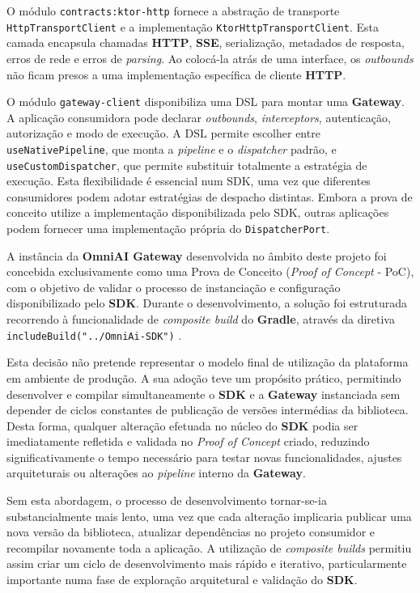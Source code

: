     O módulo \texttt{contracts:ktor-http} fornece a abstração de transporte \texttt{HttpTransportClient} e a implementação \texttt{KtorHttpTransportClient}. Esta camada encapsula chamadas \textbf{HTTP}, \textbf{SSE}, serialização, metadados de resposta, erros de rede e erros de \textit{parsing}. Ao colocá-la atrás de uma interface, os \textit{outbounds} não ficam presos a uma implementação específica de cliente \textbf{HTTP}.

    O módulo \texttt{gateway-client} disponibiliza uma DSL para montar uma \textbf{Gateway}. A aplicação consumidora pode declarar \textit{outbounds}, \textit{interceptors}, autenticação, autorização e modo de execução. A DSL permite escolher entre \texttt{useNativePipeline}, que monta a \textit{pipeline} e o \textit{dispatcher} padrão, e \texttt{useCustomDispatcher}, que permite substituir totalmente a estratégia de execução. Esta flexibilidade é essencial num SDK, uma vez que diferentes consumidores podem adotar estratégias de despacho distintas. Embora a prova de conceito utilize a implementação disponibilizada pelo SDK, outras aplicações podem fornecer uma implementação própria do \texttt{DispatcherPort}.

    A instância da \textbf{OmniAI Gateway} desenvolvida no âmbito deste projeto foi concebida exclusivamente como uma Prova de Conceito (\textit{Proof of Concept} - PoC), com o objetivo de validar o processo de instanciação e configuração disponibilizado pelo \textbf{SDK}.
    Durante o desenvolvimento, a solução foi estruturada recorrendo à funcionalidade de \textit{composite build} do \textbf{Gradle}, através da diretiva \texttt{includeBuild("../OmniAi-SDK")} \cite{gradle_composite_builds}.

    Esta decisão não pretende representar o modelo final de utilização da plataforma em ambiente de produção. A sua adoção teve um propósito prático, permitindo desenvolver e compilar simultaneamente o \textbf{SDK} e a \textbf{Gateway} instanciada sem depender de ciclos constantes de publicação de versões intermédias da biblioteca. Desta forma, qualquer alteração efetuada no núcleo do \textbf{SDK} podia ser imediatamente refletida e validada no \textit{Proof of Concept} criado, reduzindo significativamente o tempo necessário para testar novas funcionalidades, ajustes arquiteturais ou alterações ao \textit{pipeline} interno da \textbf{Gateway}.

    Sem esta abordagem, o processo de desenvolvimento tornar-se-ia substancialmente mais lento, uma vez que cada alteração implicaria publicar uma nova versão da biblioteca, atualizar dependências no projeto consumidor e recompilar novamente toda a aplicação. A utilização de \textit{composite builds} permitiu assim criar um ciclo de desenvolvimento mais rápido e iterativo, particularmente importante numa fase de exploração arquitetural e validação do \textbf{SDK}.

